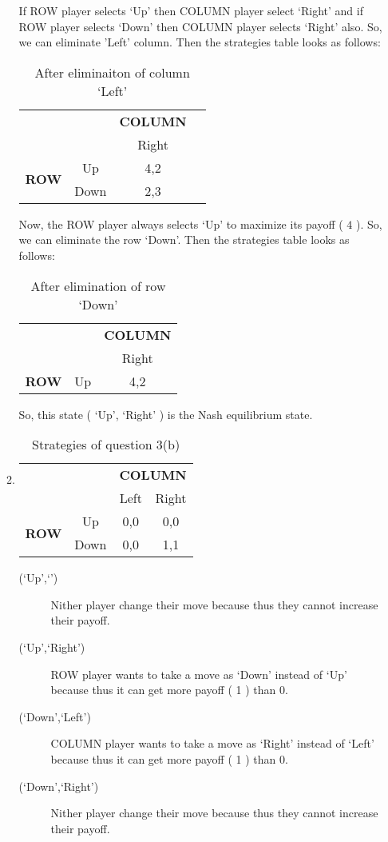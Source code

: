 \documentclass[a4paper,12pt]{article}
\begin{document}
\begin{enumerate}
\begin{enumerate}
If ROW player selects `Up' then COLUMN player select `Right' and if ROW player selects `Down' then COLUMN player selects `Right' also. So, we can eliminate 'Left' column.
Then the strategies table looks as follows:

\begin{table}[H]
\centering
\begin{tabular}{@{}cccc@{}}
\toprule
& & {\bfseries COLUMN}\\
& & Right\\
\multirow{2}{*}{\bfseries ROW} & Up & 4,2\\
 & Down & 2,3\\
\bottomrule
\end{tabular}
\caption{After eliminaiton of column `Left'}
\end{table}

Now, the ROW player always selects `Up' to maximize its payoff ( $4$ ). So, we can eliminate the row `Down'. Then the strategies table looks as follows:

\begin{table}[H]
\centering
\begin{tabular}{@{}ccc@{}}
\toprule
\multicolumn{2}{c}{} & {\bfseries COLUMN}\\
& & Right\\
{\bfseries ROW} & Up & 4,2\\
\bottomrule
\end{tabular}
\caption{After elimination of row `Down'}
\end{table}
So, this state ( `Up', `Right' ) is the Nash equilibrium state.

 \item 
\begin{table}[H]
\centering
\begin{tabular}{@{}cccc@{}}
\toprule
\multicolumn{2}{c}{} & \multicolumn{2}{c}{\bfseries COLUMN}\\
\multicolumn{2}{c}{} & Left & Right\\
\multirow{2}{*}{\bfseries ROW} & Up & 0,0 & 0,0\\
 & Down & 0,0 & 1,1\\
\bottomrule
\end{tabular}
\caption{Strategies of question 3(b)}
\end{table}

\begin{description}
 \item [(`Up',`')] Nither player change their move because thus they cannot increase their payoff.
 \item [(`Up',`Right')] ROW player wants to take a move as `Down' instead of `Up' because thus it can get more payoff ( 1 ) than 0.
 \item [(`Down',`Left')] COLUMN player wants to take a move as `Right' instead of `Left' because thus it can get more payoff ( 1 ) than 0.
 \item [(`Down',`Right')] Nither player change their move because thus they cannot increase their payoff.
 \end{description}
 

\end{enumerate}
\end{enumerate}
\end{document}
